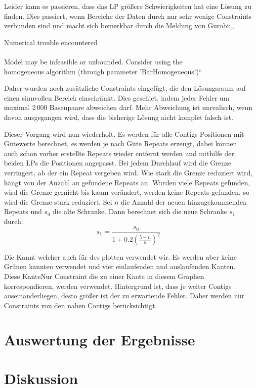 Leider kann es passieren, dass das LP größere Schwierigkeiten hat eine Lösung zu finden. Dies passiert, wenn Bereiche der Daten durch nur sehr wenige Constraints verbunden sind und macht sich bemerkbar durch die Meldung von Gurobi:„

Numerical trouble encountered\\
\\
Model may be infeasible or unbounded.  Consider using the\\
homogeneous algorithm (through parameter 'BarHomogeneous')“

Daher wurden noch zusätzliche Constraints eingefügt, die den Lösungsraum auf einen sinnvollen Bereich einschränkt. Dies geschiet, indem jeder Fehler um maximal 2\,000 Basenpaare abweichen darf. Mehr Abweichung ist unrealisch, wenn davon ausgegangen wird, dass die bisherige Lösung nicht komplet falsch ist.

Dieser Vorgang wird nun wiederholt. Es werden für alle Contigs Positionen mit Gütewerte berechnet, es werden je nach Güte Repeats erzeugt, dabei können auch schon vorher erstellte Repeats wieder entfernt werden und mithilfe der beiden LPs die Positionen angepasst. Bei jedem Durchlauf wird die Grenze verringert, ab der ein Repeat vergeben wird. Wie stark die Grenze reduziert wird, hängt von der Anzahl an gefundene Repeats an. Wurden viele Repeats gefunden, wird die Grenze gernicht bis kaum verändert, werden keine Repeats gefunden, so wird die Grenze stark reduziert. Sei $n$ die Anzahl der neuen hinzugekommenden Repeats und $s_0$ die alte Schranke. Dann berechnet sich die neue Schranke $s_1$ durch:
\[ s_1 = \frac{s_0}{1 + 0.2\left(\frac{5 - n}{5}\right)^2}\]


Die Kannt
welcher auch für des plotten verwendet wir. Es werden aber keine Grünen kannten verwendet und vier einlaufenden und auslaufenden Kanten. Diese KanteNur Constraint die zu einer Kante in diesem Graphen korrespondieren, werden verwendet. Hintergrund ist, dass je weiter Contigs auseinanderliegen, desto größer ist der zu erwartende Fehler. Daher werden nur Constraints von den nahen Contigs berücksichtigt.


\section{Auswertung der Ergebnisse}
\section{Diskussion}
\clearpage
%
%
%
\printbibliography[heading=bibintoc, title=References]
\clearpage
\listoffigures
\listoftables
